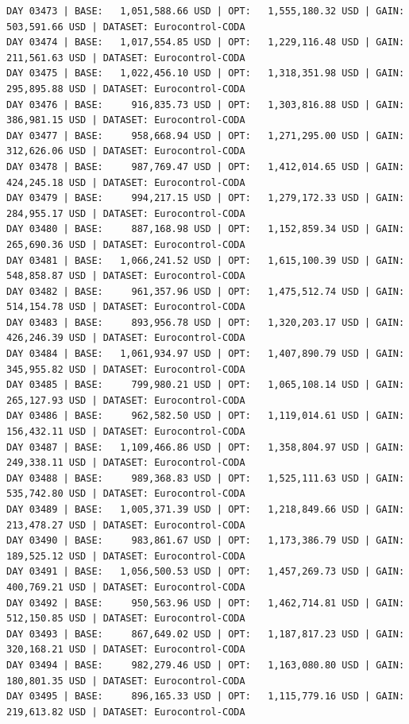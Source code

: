\documentclass[11pt,a4paper]{article}
\begin{document}
\begin{verbatim}
DAY 03473 | BASE:   1,051,588.66 USD | OPT:   1,555,180.32 USD | GAIN: 503,591.66 USD | DATASET: Eurocontrol-CODA
DAY 03474 | BASE:   1,017,554.85 USD | OPT:   1,229,116.48 USD | GAIN: 211,561.63 USD | DATASET: Eurocontrol-CODA
DAY 03475 | BASE:   1,022,456.10 USD | OPT:   1,318,351.98 USD | GAIN: 295,895.88 USD | DATASET: Eurocontrol-CODA
DAY 03476 | BASE:     916,835.73 USD | OPT:   1,303,816.88 USD | GAIN: 386,981.15 USD | DATASET: Eurocontrol-CODA
DAY 03477 | BASE:     958,668.94 USD | OPT:   1,271,295.00 USD | GAIN: 312,626.06 USD | DATASET: Eurocontrol-CODA
DAY 03478 | BASE:     987,769.47 USD | OPT:   1,412,014.65 USD | GAIN: 424,245.18 USD | DATASET: Eurocontrol-CODA
DAY 03479 | BASE:     994,217.15 USD | OPT:   1,279,172.33 USD | GAIN: 284,955.17 USD | DATASET: Eurocontrol-CODA
DAY 03480 | BASE:     887,168.98 USD | OPT:   1,152,859.34 USD | GAIN: 265,690.36 USD | DATASET: Eurocontrol-CODA
DAY 03481 | BASE:   1,066,241.52 USD | OPT:   1,615,100.39 USD | GAIN: 548,858.87 USD | DATASET: Eurocontrol-CODA
DAY 03482 | BASE:     961,357.96 USD | OPT:   1,475,512.74 USD | GAIN: 514,154.78 USD | DATASET: Eurocontrol-CODA
DAY 03483 | BASE:     893,956.78 USD | OPT:   1,320,203.17 USD | GAIN: 426,246.39 USD | DATASET: Eurocontrol-CODA
DAY 03484 | BASE:   1,061,934.97 USD | OPT:   1,407,890.79 USD | GAIN: 345,955.82 USD | DATASET: Eurocontrol-CODA
DAY 03485 | BASE:     799,980.21 USD | OPT:   1,065,108.14 USD | GAIN: 265,127.93 USD | DATASET: Eurocontrol-CODA
DAY 03486 | BASE:     962,582.50 USD | OPT:   1,119,014.61 USD | GAIN: 156,432.11 USD | DATASET: Eurocontrol-CODA
DAY 03487 | BASE:   1,109,466.86 USD | OPT:   1,358,804.97 USD | GAIN: 249,338.11 USD | DATASET: Eurocontrol-CODA
DAY 03488 | BASE:     989,368.83 USD | OPT:   1,525,111.63 USD | GAIN: 535,742.80 USD | DATASET: Eurocontrol-CODA
DAY 03489 | BASE:   1,005,371.39 USD | OPT:   1,218,849.66 USD | GAIN: 213,478.27 USD | DATASET: Eurocontrol-CODA
DAY 03490 | BASE:     983,861.67 USD | OPT:   1,173,386.79 USD | GAIN: 189,525.12 USD | DATASET: Eurocontrol-CODA
DAY 03491 | BASE:   1,056,500.53 USD | OPT:   1,457,269.73 USD | GAIN: 400,769.21 USD | DATASET: Eurocontrol-CODA
DAY 03492 | BASE:     950,563.96 USD | OPT:   1,462,714.81 USD | GAIN: 512,150.85 USD | DATASET: Eurocontrol-CODA
DAY 03493 | BASE:     867,649.02 USD | OPT:   1,187,817.23 USD | GAIN: 320,168.21 USD | DATASET: Eurocontrol-CODA
DAY 03494 | BASE:     982,279.46 USD | OPT:   1,163,080.80 USD | GAIN: 180,801.35 USD | DATASET: Eurocontrol-CODA
DAY 03495 | BASE:     896,165.33 USD | OPT:   1,115,779.16 USD | GAIN: 219,613.82 USD | DATASET: Eurocontrol-CODA

\end{verbatim}
\end{document}
